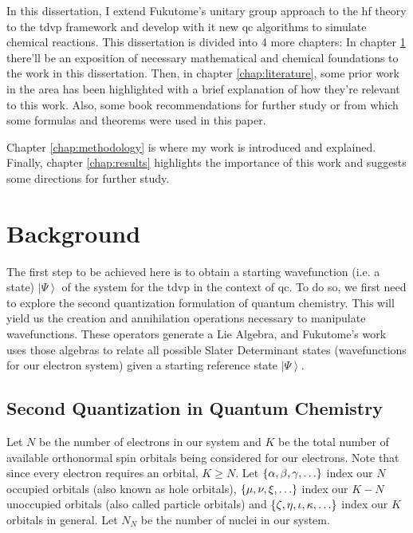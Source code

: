 \documentclass{aux/ttuthes2007}
\newcommand{\ket}[1]{\ensuremath{\left|#1\right\rangle}}
\newcommand{\elec}{N}
\newcommand{\nuc}{N_{N}}
\newcommand{\orb}{K}
\newcommand{\uo}[1]{
		\IfEqCase{#1}{
			{0}{\mu}
			{1}{\nu}
			{2}{\xi}
		}[\PackageError{uo}{Undefined option to uo: #1}{}]
}
\newcommand{\oo}[1]{
		\IfEqCase{#1}{
			{0}{\alpha}
			{1}{\beta}
			{2}{\gamma}
		}[\PackageError{unocorb}{Undefined option to unuo: #1}{}]
}
\newcommand{\go}[1]{
		\IfEqCase{#1}{
			{0}{\zeta}
			{1}{\eta}
			{2}{\iota}
			{3}{\kappa}
		}[\PackageError{unocorb}{Undefined option to go: #1}{}]
}
\begin{document}
In this dissertation, I extend Fukutome’s unitary group approach to the \gls{hf} theory to the \gls{tdvp} framework and develop with it new \gls{qc} algorithms to simulate chemical reactions.
This dissertation is divided into 4 more chapters: In chapter \ref{chap:background} there'll be an exposition of necessary mathematical and chemical foundations to the work in this dissertation.
Then, in chapter \ref{chap:literature}, some prior work in the area has been highlighted with a brief explanation of how they're relevant to this work.
Also, some book recommendations for further study or from which some formulas and theorems were used in this paper.

Chapter \ref{chap:methodology} is where my work is introduced and explained. Finally, chapter \ref{chap:results} highlights the importance of this work and suggests some directions for further study.

\chapter{\textbf{Background}}\label{chap:background}

The first step to be achieved here is to obtain a starting wavefunction (i.e. a state) $\ket\Psi$ of the system for the \gls{tdvp} in the context of \gls{qc}. 
To do so, we first need to explore the second quantization formulation of quantum chemistry. 
This will yield us the creation and annihilation operations necessary to manipulate wavefunctions.
These operators generate a Lie Algebra, and Fukutome's work  uses those algebras to relate all possible Slater Determinant states (wavefunctions for our electron system) given a starting reference state $\ket\Psi$.

\section {\textbf{Second Quantization in Quantum Chemistry}}

Let $\elec$ be the number of electrons in our system and $\orb$ be the total number of available orthonormal spin orbitals being considered for our electrons.
Note that since every electron requires an orbital, $\orb \geq \elec$.
Let 
$\{\oo{0}, \oo{1}, \oo{2}, \ldots\}$
index our $\elec$ occupied orbitals (also known as hole orbitals), 
$\{\uo{0},\uo{1},\uo{2}, \ldots\}$ 
index  our $\orb - \elec$ unoccupied orbitals (also called particle orbitals) and 
$\{\go{0}, \go{1}, \go{2}, \go{3}, \ldots\}$
index our $\orb$ orbitals in general.
Let $\nuc$ be the number of nuclei in our system.
\end{document}
